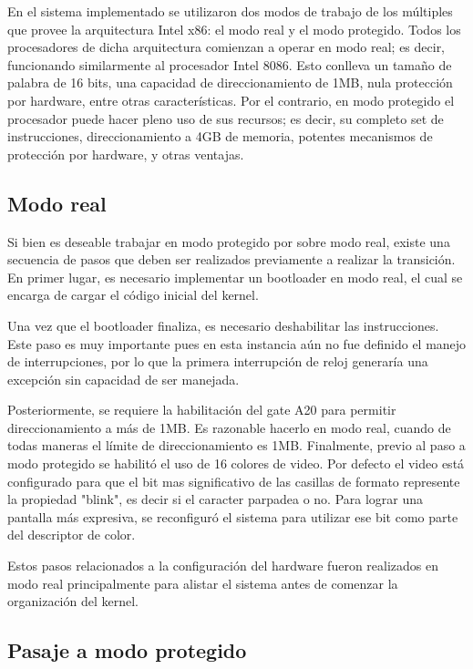 	En el sistema implementado se utilizaron dos modos de trabajo de los 
múltiples que provee la arquitectura Intel x86: el modo real y el modo protegido. Todos 
los procesadores de dicha arquitectura comienzan a operar en modo real; es decir, 
funcionando similarmente al procesador Intel 8086. Esto conlleva un tamaño de palabra 
de 16 bits, una capacidad de direccionamiento de 1MB, nula protección por hardware, 
entre otras características. Por el contrario, en modo protegido el procesador puede hacer pleno
uso de sus recursos; es decir, su completo set de instrucciones, direccionamiento a 4GB de 
memoria, potentes mecanismos de protección por hardware, y otras ventajas.

\subsection{Modo real}

	Si bien es deseable trabajar en modo protegido por sobre modo real, existe una secuencia de 
pasos que deben ser realizados previamente a realizar la transición. En primer lugar, es necesario 
implementar un bootloader en modo real, el cual se encarga de cargar el código inicial del kernel.

	Una vez que el bootloader finaliza, es necesario deshabilitar las instrucciones. Este paso es 
muy importante pues en esta instancia aún no fue definido el manejo de interrupciones, por lo que
la primera interrupción de reloj generaría una excepción sin capacidad de ser manejada.

	Posteriormente, se requiere la habilitación del gate A20 para permitir direccionamiento a más 
de 1MB. Es razonable hacerlo en modo real, cuando de todas maneras el límite de direccionamiento es 1MB.
Finalmente, previo al paso a modo protegido se habilitó el uso de 16 colores de video. Por defecto
el video está configurado para que el bit mas significativo de las casillas de formato
represente la propiedad "blink", es decir si el caracter parpadea o no. Para lograr una pantalla más 
expresiva, se reconfiguró el sistema para utilizar ese bit como parte del descriptor de color.

	Estos pasos relacionados a la configuración del hardware fueron realizados en modo real principalmente 
para alistar el sistema antes de comenzar la organización del kernel.

\subsection{Pasaje a modo protegido}

